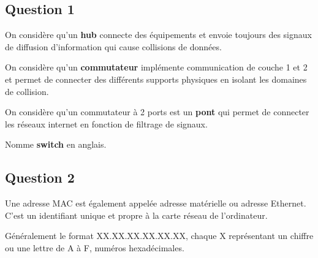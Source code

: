 \documentclass{article}
\begin{document}
\subsection*{Question 1}
\begin{definition}
    On considère qu'un \textbf{hub} connecte des équipements et envoie toujours des signaux de diffusion d'information qui cause collisions de données.  
\end{definition}

\begin{definition}
    On considère qu'un \textbf{commutateur} implémente communication de couche 1 et 2 et permet de connecter des différents supports physiques en isolant les domaines de collision.

    \begin{remark}
        On considère qu'un commutateur à 2 ports est un \textbf{pont} qui permet de connecter les réseaux internet en fonction de filtrage de signaux.
    \end{remark}
    Nomme \textbf{switch} en anglais.
\end{definition}

\subsection*{Question 2}
\begin{definition}
    Une adresse MAC est également appelée adresse matérielle ou adresse Ethernet. C'est un identifiant unique et propre à la carte réseau de l'ordinateur. 
    \begin{remark}
        Généralement le format XX.XX.XX.XX.XX.XX, chaque X représentant un chiffre ou une lettre de A à F, numéros hexadécimales.
    \end{remark}
\end{definition}

\newpage
\end{document}

